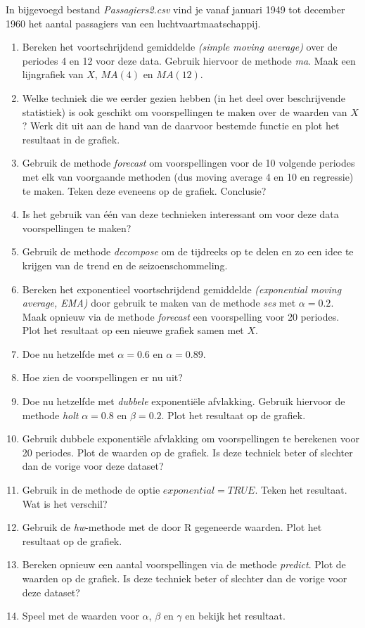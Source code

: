 \begin{exercise}
	In bijgevoegd bestand \emph{Passagiers2.csv} vind je vanaf januari 1949 tot december 1960 het aantal passagiers van een luchtvaartmaatschappij. 
	\begin{enumerate}
		\item Bereken het voortschrijdend gemiddelde \emph{(simple moving average)} over de periodes 4 en 12 voor deze data. Gebruik hiervoor de methode \emph{ma}. Maak een lijngrafiek van $X$, $MA(4)$ en $MA(12)$.
		\item Welke techniek die we eerder gezien hebben (in het deel over beschrijvende statistiek) is ook geschikt om voorspellingen te maken over de waarden van $X$? Werk dit uit aan de hand van de daarvoor bestemde functie en plot het resultaat in de grafiek.
		\item Gebruik de methode \emph{forecast} om voorspellingen voor de 10 volgende periodes met elk van voorgaande methoden (dus moving average 4 en 10 en regressie) te maken. Teken deze eveneens op de grafiek. Conclusie?
			\item Is het gebruik van één van deze technieken interessant om voor deze data voorspellingen te maken? 
		\item Gebruik de methode \emph{decompose} om de tijdreeks op te delen en zo een idee te krijgen van de trend en de seizoenschommeling.
			\item Bereken het exponentieel voortschrijdend gemiddelde \emph{(exponential moving average, EMA)} door gebruik te maken van de methode \emph{ses} met $\alpha=0.2$. Maak opnieuw via de methode \emph{forecast} een voorspelling voor 20 periodes. Plot het resultaat op een nieuwe grafiek samen met $X$.
		\item Doe nu hetzelfde met $\alpha=0.6$ en $\alpha=0.89$. 
		\item Hoe zien de voorspellingen er nu uit?
			\item Doe nu hetzelfde met \emph{dubbele} exponentiële afvlakking. Gebruik hiervoor de methode \emph{holt}  $\alpha =  0.8$ en $\beta = 0.2$. Plot het resultaat op de grafiek.
		\item Gebruik dubbele exponentiële afvlakking om voorspellingen te berekenen voor 20 periodes. Plot de waarden op de grafiek. Is deze techniek beter of slechter dan de vorige voor deze dataset?
		\item Gebruik in de methode de optie $exponential=TRUE$. Teken het resultaat.  Wat is het verschil?
			\item Gebruik de \emph{hw}-methode met de door R gegeneerde waarden. Plot het resultaat op de grafiek.
		\item Bereken opnieuw een aantal voorspellingen via de methode \emph{predict}. Plot de waarden op de grafiek. Is deze techniek beter of slechter dan de vorige voor deze dataset?
		\item Speel met de waarden voor $\alpha$, $\beta$ en $\gamma$ en bekijk het resultaat.
	\end{enumerate}
	
\end{exercise}	